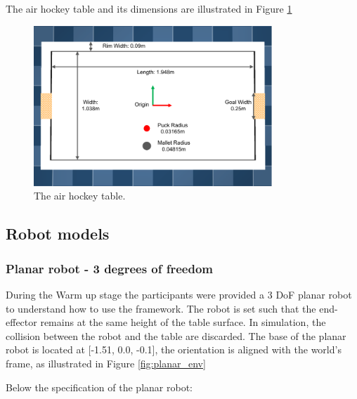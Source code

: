     The air hockey table and its dimensions are illustrated in Figure \ref{fig:air_hockey_table}


    \begin{figure}[H]
        \centering
        \includegraphics[width=0.8\textwidth]{Images/air_hockey_table}
        \caption{The air hockey table.}
        \label{fig:air_hockey_table}
    \end{figure}

\subsection{Robot models}
    \subsubsection{Planar robot - 3 degrees of freedom}
    During the Warm up stage the participants were provided a 3 DoF planar robot to understand how to use the framework.
    The robot is set such that the end-effector remains at the same height of the table surface. In simulation, the collision between the robot and the table are discarded.
    The base of the planar robot is located at [-1.51, 0.0, -0.1], the orientation is aligned with the world's frame, as illustrated in Figure \ref{fig:planar_env}


    Below the specification of the planar robot:

